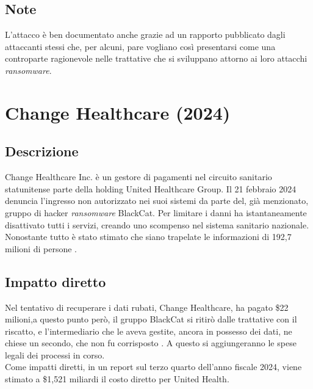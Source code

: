 \documentclass[12pt,a4paper,openright,twoside]{report}
\begin{document}
\subsection{Note}
L'attacco \`e ben documentato anche grazie ad un rapporto pubblicato dagli attaccanti stessi che, per alcuni, pare vogliano cos\`i presentarsi come una controparte ragionevole nelle trattative che si sviluppano attorno ai loro attacchi \textit{ransomware}.\\
\section{Change Healthcare (2024)}
\subsection{Descrizione}
Change Healthcare Inc. \`e un gestore di pagamenti nel circuito sanitario statunitense parte della holding United Healthcare Group. Il 21 febbraio 2024 denuncia l'ingresso non autorizzato nei suoi sistemi da parte del, gi\`a menzionato, gruppo di hacker \textit{ransomware}  BlackCat. Per limitare i danni ha istantaneamente disattivato tutti i servizi, creando uno scompenso nel sistema sanitario nazionale. Nonostante tutto \`e stato stimato che siano trapelate le informazioni di 192,7 milioni di persone \cite{ChHealth_hipaa} \cite{ChHealth_lessons}.\\
\subsection{Impatto diretto}
Nel tentativo di recuperare i dati rubati, Change Healthcare, ha pagato \$22 milioni,a questo punto per\`o, il gruppo BlackCat si ritir\`o dalle trattative con il riscatto, e l'intermediario che le aveva gestite, ancora in possesso dei dati, ne chiese un secondo, che non fu corrisposto \cite{ChHealth_hipaa}. 
A questo si aggiungeranno le spese legali dei processi in corso. \\
Come impatti diretti, in un report sul terzo quarto dell'anno fiscale 2024, viene stimato a \$1,521 miliardi il costo diretto per United Health.\\
\end{document}
